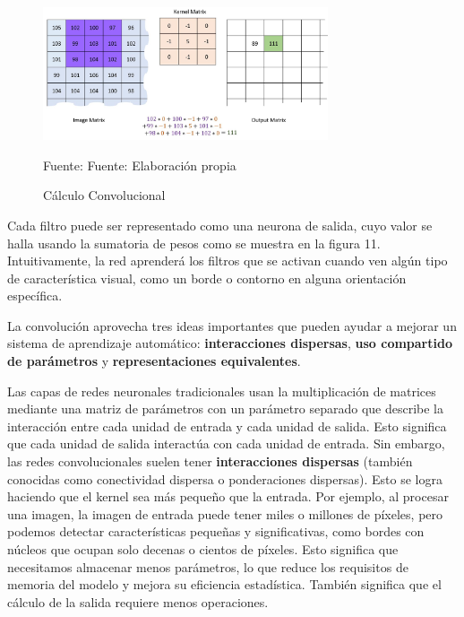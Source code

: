 		\begin{figure}[H]
		\begin{center}
		\includegraphics[width=0.75\textwidth]{images/marcoteorico/Convolution_calculation2}
		\end{center}
		\begin{center}
		\caption{\small{Cálculo Convolucional}}
		{\small{Fuente: Fuente: Elaboración propia}}
		\end{center}
		\vspace{-1.9em}
		\end{figure}

		Cada filtro puede ser representado como una neurona de salida, cuyo valor se halla usando la sumatoria de pesos como se muestra en la figura 11. Intuitivamente, la red aprenderá los filtros que se activan cuando ven algún tipo de característica visual, como un borde o contorno en alguna orientación específica. 
		
		\vskip 0.4cm  
		
		La convolución aprovecha tres ideas importantes que pueden ayudar a mejorar un sistema de aprendizaje automático: {\bf interacciones dispersas}, {\bf uso compartido de parámetros} y {\bf representaciones equivalentes}.
		
		\vskip 0.4cm  
		Las capas de redes neuronales tradicionales usan la multiplicación de matrices mediante una matriz de parámetros con un parámetro separado que describe la interacción entre cada unidad de entrada y cada unidad de salida. Esto significa que cada unidad de salida interactúa con cada unidad de entrada. Sin embargo, las redes convolucionales suelen tener {\bf interacciones dispersas} (también conocidas como conectividad dispersa o ponderaciones dispersas). Esto se logra haciendo que el kernel sea más pequeño que la entrada. Por ejemplo, al procesar una imagen, la imagen de entrada puede tener miles o millones de píxeles, pero podemos detectar características pequeñas y significativas, como bordes con núcleos que ocupan solo decenas o cientos de píxeles. Esto significa que necesitamos almacenar menos parámetros, lo que reduce los requisitos de memoria del modelo y mejora su eficiencia estadística. También significa que el cálculo de la salida requiere menos operaciones.
		
